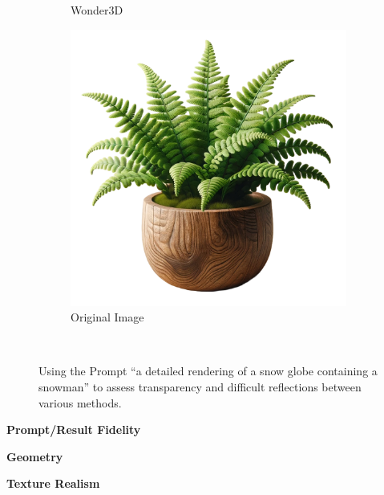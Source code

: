 \begin{figure}[ht]
\begin{subfigure}[b]{0.27\textwidth}
        \caption{Wonder3D}
        \vspace{0.1cm}
    \end{subfigure}
    \begin{subfigure}[b]{0.28\textwidth}
        \centering
        \includegraphics[width=\textwidth]{etc/Images/fern.png}
        \caption{Original Image}
        \vspace{0.1cm}
    \end{subfigure}
    \caption{Using the Prompt ``a detailed rendering of a snow globe containing a snowman'' to assess transparency and difficult reflections between various methods.}~\label{fig:resultGlobe}
\end{figure}


\textbf{Prompt/Result Fidelity}

\textbf{Geometry}

\textbf{Texture Realism}

